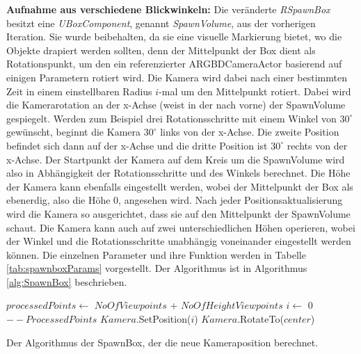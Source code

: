 \textbf{Aufnahme aus verschiedene Blickwinkeln:} Die veränderte \textit{RSpawnBox} besitzt eine \textit{UBoxComponent}, genannt \textit{SpawnVolume}, aus der vorherigen Iteration. Sie wurde beibehalten, da sie eine visuelle Markierung bietet, wo die Objekte drapiert werden sollten, denn der Mittelpunkt der Box dient als Rotationspunkt, um den ein referenzierter ARGBDCameraActor basierend auf einigen Parametern rotiert wird. Die Kamera wird dabei nach einer bestimmten Zeit in einem einstellbaren Radius $i$-mal um den Mittelpunkt rotiert. Dabei wird die Kamerarotation an der x-Achse (weist in der \unreal nach vorne) der SpawnVolume gespiegelt. Werden zum Beispiel drei Rotationsschritte mit einem Winkel von $30^\circ$ gewünscht, beginnt die Kamera $30^\circ$ links von der x-Achse. Die zweite Position befindet sich dann auf der x-Achse und die dritte Position ist $30^\circ$ rechts von der x-Achse. Der Startpunkt der Kamera auf dem Kreis um die SpawnVolume wird also in Abhängigkeit der Rotationsschritte und des Winkels berechnet. Die Höhe der Kamera kann ebenfalls eingestellt werden, wobei der Mittelpunkt der Box als ebenerdig, also die Höhe 0, angesehen wird. Nach jeder Positionsaktualisierung wird die Kamera so ausgerichtet, dass sie auf den Mittelpunkt der SpawnVolume schaut. Die Kamera kann auch auf zwei unterschiedlichen Höhen operieren, wobei der Winkel und die Rotationsschritte unabhängig voneinander eingestellt werden können. \newline
Die einzelnen Parameter und ihre Funktion werden in Tabelle \ref{tab:spawnboxParams} vorgestellt. Der Algorithmus ist in Algorithmus \ref{alg:SpawnBox} beschrieben. \par

\begin{algorithm}[H]
\BlankLine
$processedPoints \gets$ $NoOfViewpoints$ + $NoOfHeightViewpoints$\;
$i \gets$ 0\;
$--ProcessedPoints$\;
$Kamera$.SetPosition($i$)\;
$Kamera$.RotateTo($center$)\;
\caption[SpawnBox]{Der Algorithmus der SpawnBox, der die neue Kameraposition berechnet.}
\label{alg:SpawnBox}
\end{algorithm}

